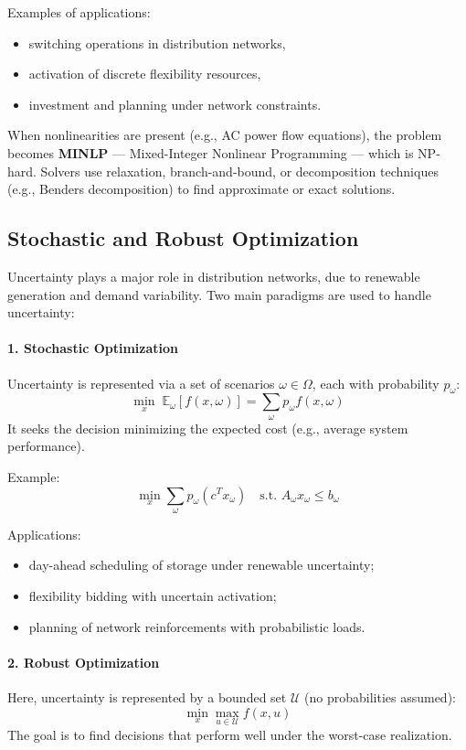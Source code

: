 \documentclass[11pt]{article}
\begin{document}
	Examples of applications:
	\begin{itemize}
		\item switching operations in distribution networks,
		\item activation of discrete flexibility resources,
		\item investment and planning under network constraints.
	\end{itemize}
	
	When nonlinearities are present (e.g., AC power flow equations), the problem becomes \textbf{MINLP} — Mixed-Integer Nonlinear Programming — which is NP-hard.  
	Solvers use relaxation, branch-and-bound, or decomposition techniques (e.g., Benders decomposition) to find approximate or exact solutions.
	
	\subsection{Stochastic and Robust Optimization}
	
	Uncertainty plays a major role in distribution networks, due to renewable generation and demand variability.  
	Two main paradigms are used to handle uncertainty:
	
	\paragraph{1. Stochastic Optimization}
	Uncertainty is represented via a set of scenarios $\omega \in \Omega$, each with probability $p_\omega$:
	\[
	\min_{x} \; \mathbb{E}_\omega [ f(x, \omega) ] = \sum_\omega p_\omega f(x, \omega)
	\]
	It seeks the decision minimizing the expected cost (e.g., average system performance).
	
	Example:
	\[
	\min_{x} \sum_\omega p_\omega (c^T x_\omega)
	\quad \text{s.t. } A_\omega x_\omega \le b_\omega
	\]
	
	Applications:
	\begin{itemize}
		\item day-ahead scheduling of storage under renewable uncertainty;
		\item flexibility bidding with uncertain activation;
		\item planning of network reinforcements with probabilistic loads.
	\end{itemize}
	
	\paragraph{2. Robust Optimization}
	Here, uncertainty is represented by a bounded set $\mathcal{U}$ (no probabilities assumed):
	\[
	\min_{x} \max_{u \in \mathcal{U}} f(x, u)
	\]
	The goal is to find decisions that perform well under the worst-case realization.
	
\end{document}
